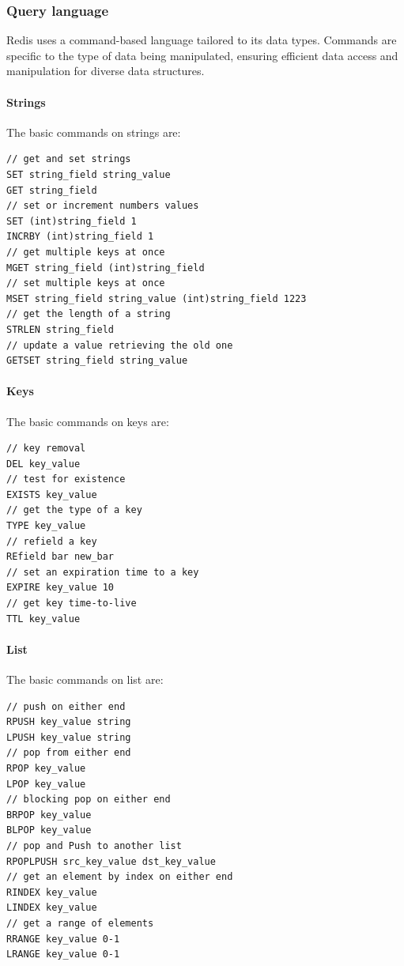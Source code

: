 \subsubsection{Query language}
Redis uses a command-based language tailored to its data types. 
Commands are specific to the type of data being manipulated, ensuring efficient data access and manipulation for diverse data structures.

\paragraph*{Strings}
The basic commands on strings are: 
\begin{lstlisting}[style=Java]
// get and set strings
SET string_field string_value
GET string_field
// set or increment numbers values
SET (int)string_field 1
INCRBY (int)string_field 1
// get multiple keys at once
MGET string_field (int)string_field
// set multiple keys at once
MSET string_field string_value (int)string_field 1223
// get the length of a string 
STRLEN string_field 
// update a value retrieving the old one
GETSET string_field string_value
\end{lstlisting}

\paragraph*{Keys}
The basic commands on keys are: 
\begin{lstlisting}[style=Java]
// key removal
DEL key_value
// test for existence 
EXISTS key_value
// get the type of a key
TYPE key_value
// refield a key
REfield bar new_bar
// set an expiration time to a key 
EXPIRE key_value 10 
// get key time-to-live 
TTL key_value
\end{lstlisting}

\paragraph*{List}
The basic commands on list are: 
\begin{lstlisting}[style=Java]
// push on either end
RPUSH key_value string
LPUSH key_value string
// pop from either end
RPOP key_value
LPOP key_value
// blocking pop on either end
BRPOP key_value
BLPOP key_value
// pop and Push to another list 
RPOPLPUSH src_key_value dst_key_value
// get an element by index on either end
RINDEX key_value
LINDEX key_value
// get a range of elements
RRANGE key_value 0-1
LRANGE key_value 0-1
\end{lstlisting}

